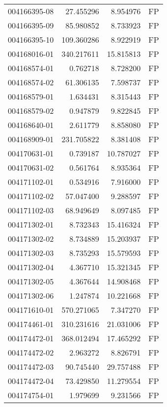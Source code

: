 \begin{tabular}{lrrl}
004166395-08 &   27.455296 &       8.954976 &   FP \\
004166395-09 &   85.980852 &       8.733923 &   FP \\
004166395-10 &  109.360286 &       8.922919 &   FP \\
004168016-01 &  340.217611 &      15.815813 &   FP \\
004168574-01 &    0.762718 &       8.728200 &   FP \\
004168574-02 &   61.306135 &       7.598737 &   FP \\
004168579-01 &    1.634431 &       8.315443 &   FP \\
004168579-02 &    0.947879 &       9.822845 &   FP \\
004168640-01 &    2.611779 &       8.858080 &   FP \\
004168909-01 &  231.705822 &       8.381408 &   FP \\
004170631-01 &    0.739187 &      10.787027 &   FP \\
004170631-02 &    0.561764 &       8.935364 &   FP \\
004171102-01 &    0.534916 &       7.916000 &   FP \\
004171102-02 &   57.047400 &       9.288597 &   FP \\
004171102-03 &   68.949649 &       8.097485 &   FP \\
004171302-01 &    8.732343 &      15.416324 &   FP \\
004171302-02 &    8.734889 &      15.203937 &   FP \\
004171302-03 &    8.735293 &      15.579593 &   FP \\
004171302-04 &    4.367710 &      15.321345 &   FP \\
004171302-05 &    4.367644 &      14.908468 &   FP \\
004171302-06 &    1.247874 &      10.221668 &   FP \\
004171610-01 &  570.271065 &       7.347270 &   FP \\
004174461-01 &  310.231616 &      21.031006 &   FP \\
004174472-01 &  368.012494 &      17.465292 &   FP \\
004174472-02 &    2.963272 &       8.826791 &   FP \\
004174472-03 &   90.745440 &      29.757488 &   FP \\
004174472-04 &   73.429850 &      11.279554 &   FP \\
004174754-01 &    1.979699 &       9.231566 &   FP \\

\end{tabular}
